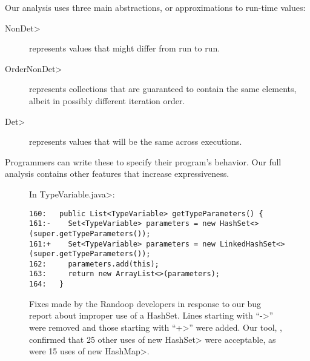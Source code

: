 Our analysis uses three main abstractions, or approximations to run-time values:
\begin{description}
\item[\<NonDet>] represents values that might differ from run to run.
\item[\<OrderNonDet>] represents collections that are guaranteed to contain
  the same elements, albeit in possibly different iteration order.
\item[\<Det>] represents values that will be the same across executions.
\end{description}
\noindent
Programmers can write these to specify their program's behavior.
Our full analysis contains other features that increase
expressiveness.

\begin{figure}

\noindent
In \<TypeVariable.java>:

\begin{Verbatim}
160:   public List<TypeVariable> getTypeParameters() {
161:-    Set<TypeVariable> parameters = new HashSet<>(super.getTypeParameters());
161:+    Set<TypeVariable> parameters = new LinkedHashSet<>(super.getTypeParameters());
162:     parameters.add(this);
163:     return new ArrayList<>(parameters);
164:   }
\end{Verbatim}

\caption{Fixes made by the Randoop developers in response to our bug report
  about improper use of a HashSet.  Lines starting with ``\<->'' were
 removed and those starting with ``\<+>'' were added.
 Our tool, \theDeterminismChecker, confirmed that 
25 other uses of \<new HashSet> were acceptable, as were 15 uses of \<new HashMap>.}
\label{fig:randoop-bug-hashset}
\end{figure}



